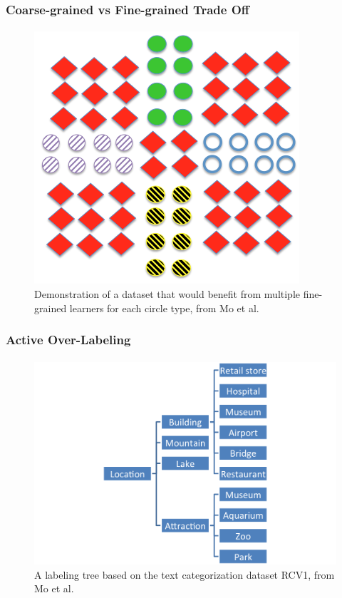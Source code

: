 \documentclass{beamer}
\begin{document}
\begin{frame}
    \frametitle{Coarse-grained vs Fine-grained Trade Off}
    \framesubtitle{}
    \begin{figure}[!htb]
	\centering
    \includegraphics[width=0.5\columnwidth]{fig/union}
    \caption{Demonstration of a dataset that would benefit from multiple fine-grained
    learners for each circle type, from Mo et al.}
    \label{fig:union}
\end{figure}
\end{frame}
\begin{frame}
    \frametitle{Active Over-Labeling}
    \framesubtitle{}
    \begin{figure}[!htb]
        \centering
        \includegraphics[width=0.85\columnwidth]{fig/exp-ontology}
        \caption{A labeling tree based on the text categorization dataset RCV1, from Mo et al.}
        \label{fig:exp-ontology}
    \end{figure}
\end{frame}
\end{document}

